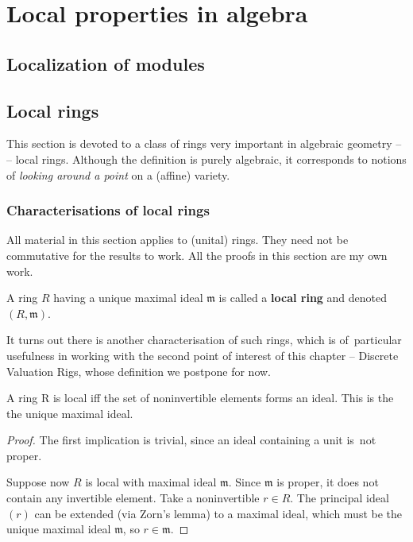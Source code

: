 \chapter{Local properties in algebra}

\section{Localization of modules}

\section{Local rings}

This section is devoted to a class of rings very important in algebraic geometry --
-- local rings. Although the definition is purely algebraic, it corresponds to
notions of \textit{looking around a point} on a (affine) variety.

\subsection{Characterisations of local rings}

All material in this section applies to (unital) rings. They need not be commutative
for the results to work. All the proofs in this section are my own work.

\begin{def}
    A ring \( R \) having a unique maximal ideal \( \mathfrak{m} \) is called
    a {\bf local ring} and denoted \( (R, \mathfrak{m}) \).
\end{def}

It turns out there is another characterisation of such rings, which is of~particular
usefulness in working with the second point of interest of this chapter -- Discrete
Valuation Rigs, whose definition we postpone for now.

\begin{thm}
    A ring R is local iff the set of noninvertible elements forms an ideal.
    This is the the unique maximal ideal.
\end{thm}

\begin{proof}
    The first implication is trivial, since an ideal containing a unit
    is~not proper.

    Suppose now \( R \) is local with maximal ideal \( \mathfrak{m} \).
    Since \( \mathfrak{m} \) is proper, it does not contain any invertible
    element. Take a noninvertible \( r \in R \). The principal ideal \( (r) \)
    can be extended (via Zorn's lemma) to a maximal ideal, which must be
    the unique maximal ideal \( \mathfrak{m} \), so \( r \in \mathfrak{m} \).

\end{proof}

